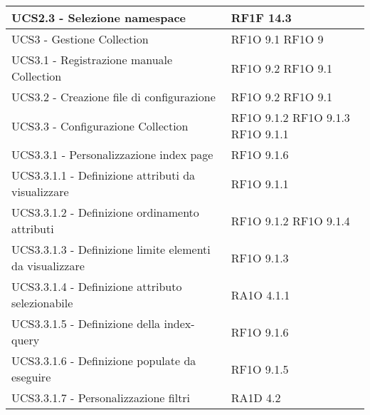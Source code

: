 \begin{center}
\begin{longtable}{ | p{5cm} | p{5cm} |}
            UCS2.3 - Selezione namespace &  RF1F 14.3 \newline  \\ \hline      
            UCS3 - Gestione Collection &  RF1O 9.1  \newline  RF1O 9  \newline  \\ \hline      
            UCS3.1 - Registrazione manuale Collection &  RF1O 9.2 \newline  RF1O 9.1  \newline  \\ \hline      
            UCS3.2 - Creazione file di configurazione &  RF1O 9.2 \newline  RF1O 9.1  \newline  \\ \hline      
            UCS3.3 - Configurazione Collection &  RF1O 9.1.2  \newline  RF1O 9.1.3  \newline  RF1O 9.1.1  \newline  \\ \hline      
            UCS3.3.1 - Personalizzazione index page &  RF1O 9.1.6 \newline  \\ \hline      
            UCS3.3.1.1 - Definizione attributi da visualizzare &  RF1O 9.1.1  \newline  \\ \hline      
            UCS3.3.1.2 - Definizione ordinamento attributi &  RF1O 9.1.2  \newline  RF1O 9.1.4  \newline  \\ \hline      
            UCS3.3.1.3 - Definizione limite elementi da visualizzare &  RF1O 9.1.3  \newline  \\ \hline      
            UCS3.3.1.4 - Definizione attributo selezionabile &  RA1O 4.1.1  \newline  \\ \hline      
            UCS3.3.1.5 - Definizione della index-query &  RF1O 9.1.6 \newline  \\ \hline      
            UCS3.3.1.6 - Definizione populate da eseguire &  RF1O 9.1.5 \newline  \\ \hline      
            UCS3.3.1.7 - Personalizzazione filtri &  RA1D 4.2  \newline  \\ \hline      

\end{longtable}
\end{center}
